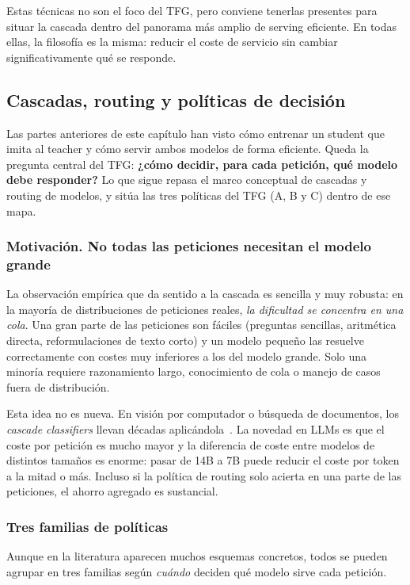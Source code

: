 Estas técnicas no son el foco del TFG, pero conviene tenerlas presentes para situar la cascada dentro del panorama más amplio de serving eficiente. En todas ellas, la filosofía es la misma: reducir el coste de servicio sin cambiar significativamente qué se responde.

\subsection{Cascadas, routing y políticas de decisión}

Las partes anteriores de este capítulo han visto cómo entrenar un student que imita al teacher y cómo servir ambos modelos de forma eficiente. Queda la pregunta central del TFG: \textbf{¿cómo decidir, para cada petición, qué modelo debe responder?} Lo que sigue repasa el marco conceptual de cascadas y routing de modelos, y sitúa las tres políticas del TFG (A, B y C) dentro de ese mapa.

\subsubsection{Motivación. No todas las peticiones necesitan el modelo grande}

La observación empírica que da sentido a la cascada es sencilla y muy robusta: en la mayoría de distribuciones de peticiones reales, \textit{la dificultad se concentra en una cola}. Una gran parte de las peticiones son fáciles (preguntas sencillas, aritmética directa, reformulaciones de texto corto) y un modelo pequeño las resuelve correctamente con costes muy inferiores a los del modelo grande. Solo una minoría requiere razonamiento largo, conocimiento de cola o manejo de casos fuera de distribución.

Esta idea no es nueva. En visión por computador o búsqueda de documentos, los \textit{cascade classifiers} llevan décadas aplicándola~\cite{viola2001cascade}. La novedad en LLMs es que el coste por petición es mucho mayor y la diferencia de coste entre modelos de distintos tamaños es enorme: pasar de 14B a 7B puede reducir el coste por token a la mitad o más. Incluso si la política de routing solo acierta en una parte de las peticiones, el ahorro agregado es sustancial.

\subsubsection{Tres familias de políticas}

Aunque en la literatura aparecen muchos esquemas concretos, todos se pueden agrupar en tres familias según \textit{cuándo} deciden qué modelo sirve cada petición.

